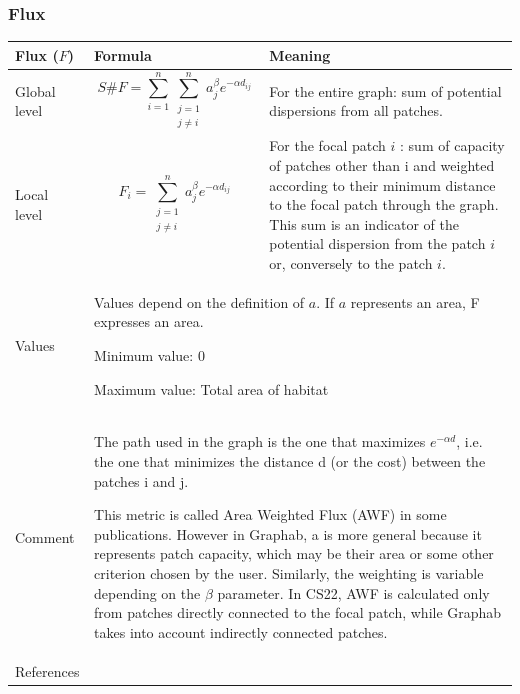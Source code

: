 \documentclass{article}
\begin{document}
\subsubsection{Flux}
\label{metric_F}
\begin{table}[H]
\begin{tabular}{|m{3.24cm}|m{4.4810004cm}m{7.924cm}|}
\hline 
Flux ($F$) &  \multicolumn{1}{m{4.4810004cm}|}{Formula} &
Meaning\\\hline
Global level &
\multicolumn{1}{m{4.4810004cm}|}{\begin{equation*}
S\#F=\sum _{i=1}^{n}{\sum
_{\begin{matrix}j=1\\j{\neq}i\end{matrix}}^{n}{{a}_{j}^{\beta
}}}{e}^{-\alpha {d}_{\mathit{ij}}}
\end{equation*}
} &
For the entire graph: sum of potential dispersions from all
patches.\\\hline
Local level &
\multicolumn{1}{m{4.4810004cm}|}{\begin{equation*}
{F}_{i}=\sum
_{\begin{matrix}j=1\\j{\neq}i\end{matrix}}^{n}{{a}_{j}^{\beta
}}{e}^{-\alpha {d}_{\mathit{ij}}}
\end{equation*}
} &
For the focal patch $i$ : sum of capacity of patches other than i and
weighted according to their minimum distance to the focal patch through
the graph. This sum is an indicator of the potential dispersion from
the patch $i$ or, conversely to the patch $i$.\\\hline
Values &
\multicolumn{2}{m{12.6050005cm}|}{
Values depend on the definition of $a$.
If $a$ represents an area, F expresses an area.

Minimum value: 0

Maximum value: Total area of habitat 
}\\\hline
Comment &
\multicolumn{2}{m{12.6050005cm}|}{The path used in the graph is the one
that maximizes  ${e}^{-\mathit{\alpha d}}$, i.e. the one that minimizes
the distance d (or the cost) between the patches i and j. 

This metric is called Area Weighted Flux (AWF) in some publications.
However in Graphab, a is more general because it represents patch
capacity, which may be their area or some other criterion chosen by the
user. Similarly, the weighting is variable depending on the $\beta $
parameter. In CS22, AWF is calculated only from patches directly
connected to the focal patch, while Graphab takes into account
indirectly connected patches.

}\\\hline
References &
\multicolumn{2}{m{12.6050005cm}|}{
\cite{Urban2001} \cite{Saura2009} \cite{2012_SDM}
}\\\hline
\end{tabular}
\end{table}
\end{document}
